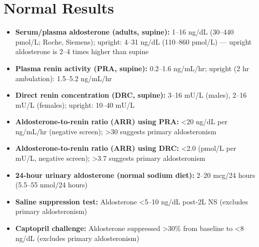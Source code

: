 \section*{Normal Results}
\begin{itemize}
  \item \textbf{Serum/plasma aldosterone (adults, supine):} 1--16 ng/dL (30--440 pmol/L; Roche, Siemens); upright: 4--31 ng/dL (110--860 pmol/L) --- upright aldosterone is 2--4 times higher than supine
  \item \textbf{Plasma renin activity (PRA, supine):} 0.2--1.6 ng/mL/hr; upright (2 hr ambulation): 1.5--5.2 ng/mL/hr
  \item \textbf{Direct renin concentration (DRC, supine):} 3--16 mU/L (males), 2--16 mU/L (females); upright: 10--40 mU/L
  \item \textbf{Aldosterone-to-renin ratio (ARR) using PRA:} <20 ng/dL per ng/mL/hr (negative screen); >30 suggests primary aldosteronism
  \item \textbf{Aldosterone-to-renin ratio (ARR) using DRC:} <2.0 (pmol/L per mU/L, negative screen); >3.7 suggests primary aldosteronism
  \item \textbf{24-hour urinary aldosterone (normal sodium diet):} 2--20 mcg/24 hours (5.5--55 nmol/24 hours)
  \item \textbf{Saline suppression test:} Aldosterone <5--10 ng/dL post-2L NS (excludes primary aldosteronism)
  \item \textbf{Captopril challenge:} Aldosterone suppressed >30\% from baseline to <8 ng/dL (excludes primary aldosteronism)
\end{itemize}

